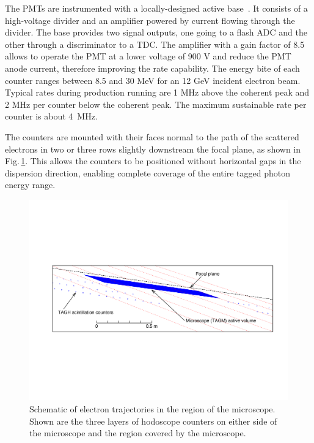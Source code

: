 The PMTs are instrumented with a locally-designed active base~\cite{tagh:base}.
It consists of a high-voltage divider and an amplifier powered by current
flowing through the divider. The base provides two signal outputs, one going
to a flash ADC and the other through a discriminator to a TDC.
The amplifier with a gain factor of 8.5 allows to operate the PMT at a
lower voltage of 900 V and reduce the PMT anode current, therefore improving
the rate capability. The energy bite of each counter ranges between 8.5 and
30 MeV for an 12 GeV incident electron beam.  Typical rates during production
running are 1 MHz above the coherent peak and 2 MHz per counter below the
coherent peak. The maximum sustainable rate per counter is about 4~MHz.

The counters are mounted with their faces normal to the path of the
scattered electrons in two or three rows slightly downstream the focal
plane, as shown in Fig.\,\ref{fig:beam:BEAM_taggerdetectors}.
This allows the counters to be positioned without horizontal gaps in
the dispersion direction, enabling complete coverage of the entire
tagged photon energy range.

\begin{figure}[tbp]
\begin{center}
      \includegraphics[width=0.95\linewidth,viewport=80 200 750 400]{figures/BEAM_taggerdetectors.pdf}
\caption{Schematic of electron trajectories in the region of the microscope. Shown are the three layers of hodoscope counters on either side of the microscope and the 
               region covered by the microscope.
       \label{fig:beam:BEAM_taggerdetectors}  }

\end{center}
\end{figure}

